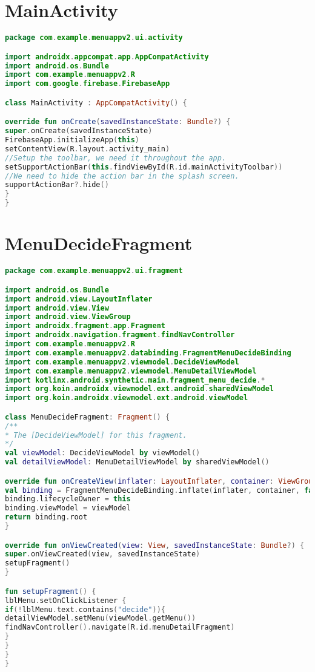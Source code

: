 \section{MainActivity}
\begin{lstlisting}[caption= Mainactivity.kt , language=Kotlin]
package com.example.menuappv2.ui.activity

import androidx.appcompat.app.AppCompatActivity
import android.os.Bundle
import com.example.menuappv2.R
import com.google.firebase.FirebaseApp

class MainActivity : AppCompatActivity() {

override fun onCreate(savedInstanceState: Bundle?) {
super.onCreate(savedInstanceState)
FirebaseApp.initializeApp(this)
setContentView(R.layout.activity_main)
//Setup the toolbar, we need it throughout the app.
setSupportActionBar(this.findViewById(R.id.mainActivityToolbar))
//We need to hide the action bar in the splash screen.
supportActionBar?.hide()
}
}
\end{lstlisting}

\section{MenuDecideFragment}
\begin{lstlisting}[caption= MenuDecideFragment.kt , language=Kotlin]
package com.example.menuappv2.ui.fragment

import android.os.Bundle
import android.view.LayoutInflater
import android.view.View
import android.view.ViewGroup
import androidx.fragment.app.Fragment
import androidx.navigation.fragment.findNavController
import com.example.menuappv2.R
import com.example.menuappv2.databinding.FragmentMenuDecideBinding
import com.example.menuappv2.viewmodel.DecideViewModel
import com.example.menuappv2.viewmodel.MenuDetailViewModel
import kotlinx.android.synthetic.main.fragment_menu_decide.*
import org.koin.androidx.viewmodel.ext.android.sharedViewModel
import org.koin.androidx.viewmodel.ext.android.viewModel

class MenuDecideFragment: Fragment() {
/**
* The [DecideViewModel] for this fragment.
*/
val viewModel: DecideViewModel by viewModel()
val detailViewModel: MenuDetailViewModel by sharedViewModel()

override fun onCreateView(inflater: LayoutInflater, container: ViewGroup?, savedInstanceState: Bundle?): View? {
val binding = FragmentMenuDecideBinding.inflate(inflater, container, false)
binding.lifecycleOwner = this
binding.viewModel = viewModel
return binding.root
}

override fun onViewCreated(view: View, savedInstanceState: Bundle?) {
super.onViewCreated(view, savedInstanceState)
setupFragment()
}

fun setupFragment() {
lblMenu.setOnClickListener {
if(!lblMenu.text.contains("decide")){
detailViewModel.setMenu(viewModel.getMenu())
findNavController().navigate(R.id.menuDetailFragment)
}
}
}
}
\end{lstlisting}

